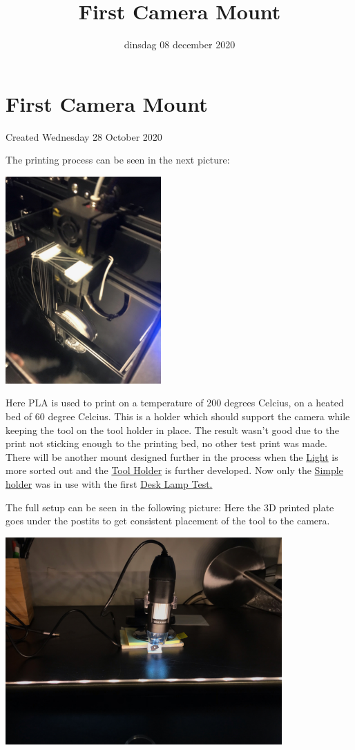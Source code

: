\documentclass{scrartcl}
\title{First Camera Mount}
\date{dinsdag 08 december 2020}
\author{}
\begin{document}
\maketitle

		\section{First Camera Mount}

Created Wednesday 28 October 2020



The printing process can be seen in the next picture:

\includegraphics[height=3.125000in, keepaspectratio=true]{./First_Camera_Mount/3D_print_houder.jpeg}



Here PLA is used to print on a temperature of 200 degrees Celcius, on a heated bed of 60 degree Celcius. This is a holder which should support the camera while keeping the tool on the tool holder in place. The result wasn't good due to the print not sticking enough to the printing bed, no other test print was made. There will be another mount designed further in the process when the \href{../Light.tex}{Light}  is more sorted out and the \href{../Tool_Holder.tex}{Tool Holder} is further developed. Now only the \href{../Tool_Holder/Simple_holder.tex}{Simple holder} was in use with the first \href{../Light/Desk_Lamp_Test.tex}{Desk Lamp Test.} 



The full setup can be seen in the following picture: Here the 3D printed plate goes under the postits to get consistent placement of the tool to the camera. 

\includegraphics[height=3.125000in, keepaspectratio=true]{./First_Camera_Mount/eerste_setup_andere_richting.jpeg}
\end{document}
